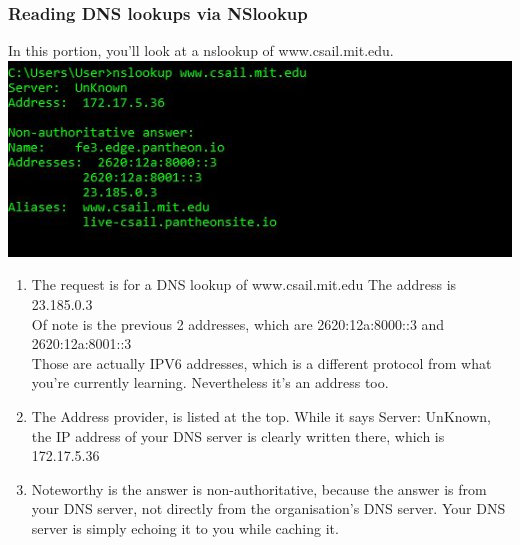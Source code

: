 \documentclass{article}
\begin{document}
\subsubsection{Reading DNS lookups via NSlookup}
In this portion, you'll look at a nslookup of www.csail.mit.edu.\\
\includegraphics{DNS-via-nslookup.JPG}
\begin{enumerate}
    \item The request is for a DNS lookup of www.csail.mit.edu
    The address is 23.185.0.3\\
    Of note is the previous 2 addresses, which are 2620:12a:8000::3 and 2620:12a:8001::3\\
    Those are actually IPV6 addresses, which is a different protocol from what you're currently learning. Nevertheless it's an address too.
    \item The Address provider, is listed at the top. While it says Server: UnKnown, the IP address of your DNS server is clearly written there, which is 172.17.5.36
    \item Noteworthy is the answer is non-authoritative, because the answer is from your DNS server, not directly from the organisation's DNS server. Your DNS server is simply echoing it to you while caching it.
\end{enumerate}
\end{document}
